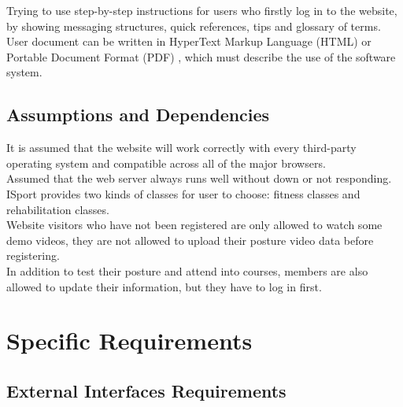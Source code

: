 \documentclass[16pt]{scrreprt}
\begin{document}
 
Trying to use step-by-step instructions for users who firstly log in to the website, by showing messaging structures, quick references, tips and glossary of terms.\\

 
User document can be written in HyperText Markup Language (HTML) or Portable Document Format (PDF) , which must describe the use of the software system.

 
\section{Assumptions and Dependencies}

 
It is assumed that the website will work correctly with every third-party operating
system and compatible across all of the major browsers.\\

 
Assumed that the web server always runs well without down or not responding.\\

 
ISport provides two kinds of classes for user to choose: fitness classes and rehabilitation classes.\\

 
Website visitors who have not been registered are only allowed to watch some demo videos, they are not allowed to upload their posture video data before registering.\\

 
In addition to test their posture and attend into courses, members are also allowed to update their information, but they have to log in first.\\


\chapter{Specific Requirements}
\label{Specific Requirements}
\section{External Interfaces Requirements}
\end{document}

